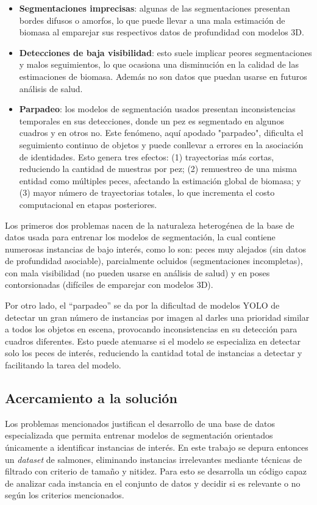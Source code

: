 \begin{itemize}
    \setlength{\itemsep}{0pt}%
    \item \textbf{Segmentaciones imprecisas}: algunas de las segmentaciones presentan bordes difusos o amorfos, lo que puede llevar a una mala estimación de biomasa al emparejar sus respectivos datos de profundidad con modelos 3D.
    \item \textbf{Detecciones de baja visibilidad}: esto suele implicar peores segmentaciones y malos seguimientos, lo que ocasiona una disminución en la calidad de las estimaciones de biomasa. Además no son datos que puedan usarse en futuros análisis de salud.
    \item \textbf{Parpadeo}: los modelos de segmentación usados presentan inconsistencias temporales en sus detecciones, donde un pez es segmentado en algunos cuadros y en otros no. Este fenómeno, aquí apodado "parpadeo", dificulta el seguimiento continuo de objetos y puede conllevar a errores en la asociación de identidades. Esto genera tres efectos: (1) trayectorias más cortas, reduciendo la cantidad de muestras por pez; (2) remuestreo de una misma entidad como múltiples peces, afectando la estimación global de biomasa; y (3) mayor número de trayectorias totales, lo que incrementa el costo computacional en etapas posteriores.
\end{itemize}

Los primeros dos problemas nacen de la naturaleza heterogénea de la base de datos usada para entrenar los modelos de segmentación, la cual contiene numerosas instancias de bajo interés, como lo son: peces muy alejados (sin datos de profundidad asociable), parcialmente ocluidos (segmentaciones incompletas), con mala visibilidad (no pueden usarse en análisis de salud) y en poses contorsionadas (difíciles de emparejar con modelos 3D).

Por otro lado, el ``parpadeo'' se da por la dificultad de modelos YOLO de detectar un gran número de instancias por imagen al darles una prioridad similar a todos los objetos en escena, provocando inconsistencias en su detección para cuadros diferentes. Esto puede atenuarse si el modelo se especializa en detectar solo los peces de interés, reduciendo la cantidad total de instancias a detectar y facilitando la tarea del modelo.

\subsection{Acercamiento a la solución}
Los problemas mencionados justifican el desarrollo de una base de datos especializada que permita entrenar modelos de segmentación orientados únicamente a identificar instancias de interés. En este trabajo se depura entonces un \textit{dataset} de salmones, eliminando instancias irrelevantes mediante técnicas de filtrado con criterio de tamaño y nitidez. Para esto se desarrolla un código capaz de analizar cada instancia en el conjunto de datos y decidir si es relevante o no según los criterios mencionados.

